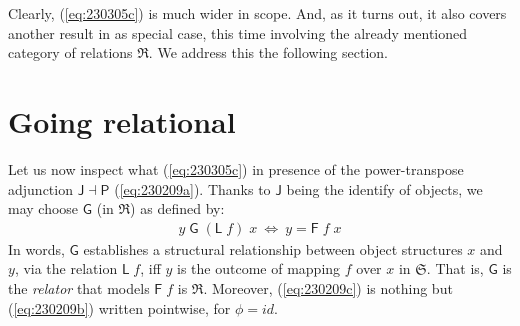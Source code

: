 \documentclass{elsarticle}
\newcommand{\Varid}[1]{\mathit{#1}}
\def\fun#1{\mathsf{#1}}
\def\cat#1{{\mathfrak #1}}
\begin{document}
Clearly, (\ref{eq:230305c}) is much wider in scope. And, as it turns out,
it also covers another result in \cite{BM97} as special case, this time involving
the already mentioned category of relations \ensuremath{\cat{R}}. We address this the following section.

\section{Going relational}
Let us now inspect what (\ref{eq:230305c}) in presence of the power-transpose adjunction
\ensuremath{\fun J \mathbin\dashv \fun P } (\ref{eq:230209a}). Thanks to \ensuremath{\fun J } being the identify of objects, we may choose
\ensuremath{\fun G } (in \ensuremath{\cat{R}}) as defined by:
\begin{eqnarray}
	\ensuremath{\Varid{y}\;\fun G \;(\fun L \;\Varid{f})\;\Varid{x}~\Leftrightarrow~\Varid{y}\mathrel{=}\fun F \;\Varid{f}\;\Varid{x}}
	\label{eq:230209c}
\end{eqnarray}
In words, \ensuremath{\fun G } establishes a structural relationship between object structures \ensuremath{\Varid{x}} and \ensuremath{\Varid{y}},
via the relation \ensuremath{\fun L \;\Varid{f}}, iff \ensuremath{\Varid{y}} is the outcome of mapping \ensuremath{\Varid{f}} over \ensuremath{\Varid{x}} in \ensuremath{\cat{S}}.
That is, \ensuremath{\fun G } is the \emph{relator} \cite{R*92} that models \ensuremath{\fun F \;\Varid{f}} is \ensuremath{\cat{R}}. Moreover, (\ref{eq:230209c})
is nothing but (\ref{eq:230209b}) written pointwise, for \ensuremath{\phi \mathrel{=}{id}}. 
\end{document}
